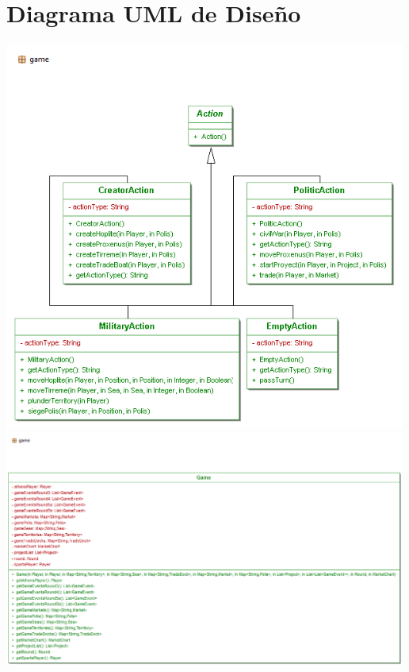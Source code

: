 \documentclass[11 pt]{book}
\begin{document}
	\section{Diagrama UML de Diseño}
		\begin{center}
		    \includegraphics[width=500px]{design-uml/iteration3/game-actions.png}
		    \includegraphics[width=500px]{design-uml/iteration3/game-game.png}

\end{center}
\end{document}
